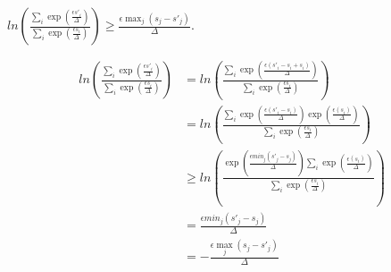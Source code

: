 \documentclass{article}
\begin{document}
\begin{lemma}
    \label{priv-inequality}
    $ln\left(\frac{\sum_{i} \exp(\frac{\epsilon s'_i}{\Delta})}{\sum_{i} \exp(\frac{\epsilon s_i}{\Delta})}\right) \geq \frac{\epsilon \max_j (s_j - s'_j)}{\Delta}$.
\end{lemma}

\begin{align*}
    ln\left(\frac{\sum_{i} \exp(\frac{\epsilon s'_i}{\Delta})}{\sum_{i} \exp(\frac{\epsilon s_i}{\Delta})}\right)
    &= ln\left(\frac{\sum_{i} \exp(\frac{\epsilon (s'_i - s_i + s_i)}{\Delta})}{\sum_{i} \exp(\frac{\epsilon s_i}{\Delta})}\right) \\
    &= ln\left(\frac{\sum_{i} \exp(\frac{\epsilon (s'_i - s_i)}{\Delta})\exp(\frac{\epsilon (s_i)}{\Delta})}{\sum_{i} \exp(\frac{\epsilon s_i}{\Delta})}\right) \\
    &\geq ln\left(\frac{\exp(\frac{\epsilon min_j(s'_j - s_j)}{\Delta}) \sum_{i} \exp(\frac{\epsilon (s_i)}{\Delta})}{\sum_{i} \exp(\frac{\epsilon s_i}{\Delta})}\right) \\
    &= \frac{\epsilon min_j(s'_j - s_j)}{\Delta} \\
    &= -\frac{\epsilon \max_j (s_j - s'_j)}{\Delta}
\end{align*}




\end{document}
